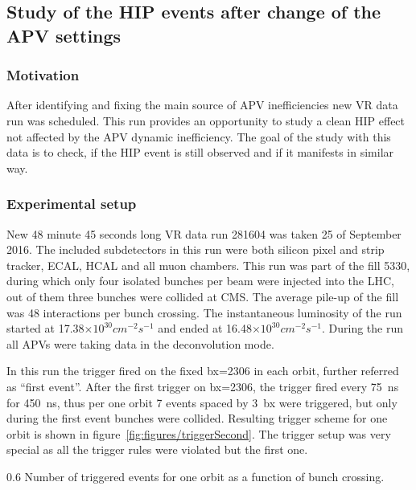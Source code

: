 \subsection{Study of the HIP events after change of the APV settings}

\subsubsection{Motivation}

After identifying and fixing the main source of APV inefficiencies new VR data run was scheduled. This run provides an opportunity to study a clean HIP effect not affected by the APV dynamic inefficiency. The goal of the study with this data is to check, if the HIP event is still observed and if it manifests in similar way.


\subsubsection{Experimental setup}

New 48 minute 45 seconds long VR data run 281604 was taken 25 of September 2016. The included subdetectors in this run were both silicon pixel and strip tracker, ECAL, HCAL and all muon chambers. This run was part of the fill 5330, during which only four isolated bunches per beam were injected into the LHC, out of them three bunches were collided at CMS. The average pile-up of the fill was 48 interactions per bunch crossing. The instantaneous luminosity of the run started at 17.38$\times 10^{30} cm^{-2} s^{-1}$ and ended at 16.48$\times 10^{30} cm^{-2} s^{-1}$. During the run all APVs were taking data in the deconvolution mode. 

In this run the trigger fired on the fixed bx=2306 in each orbit, further referred as ``first event''. After the first trigger on bx=2306, the trigger fired every 75~ns for 450~ns, thus per one orbit 7 events spaced by 3~bx were triggered, but only during the first event bunches were collided. Resulting trigger scheme for one orbit is shown in figure~\ref{fig:figures/triggerSecond}. The trigger setup was very special as all the trigger rules were violated but the first one.

                 {0.6}       %
                 {Number of triggered events for one orbit as a function of bunch crossing.} %

